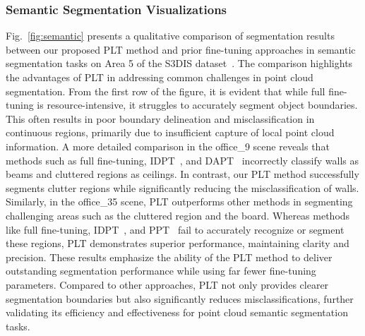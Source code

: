 

\subsubsection{Semantic Segmentation Visualizations}  
Fig.~\ref{fig:semantic} presents a qualitative comparison of segmentation results between our proposed PLT method and prior fine-tuning approaches in semantic segmentation tasks on Area 5 of the S3DIS dataset~\cite{armeni20163d}. The comparison highlights the advantages of PLT in addressing common challenges in point cloud segmentation. From the first row of the figure, it is evident that while full fine-tuning is resource-intensive, it struggles to accurately segment object boundaries. This often results in poor boundary delineation and misclassification in continuous regions, primarily due to insufficient capture of local point cloud information. A more detailed comparison in the office\_9 scene reveals that methods such as full fine-tuning, IDPT~\cite{zha2023instance}, and DAPT~\cite{zhou2024dynamic} incorrectly classify walls as beams and cluttered regions as ceilings. In contrast, our PLT method successfully segments clutter regions while significantly reducing the misclassification of walls. Similarly, in the office\_35 scene, PLT outperforms other methods in segmenting challenging areas such as the cluttered region and the board. Whereas methods like full fine-tuning, IDPT~\cite{zha2023instance}, and PPT~\cite{zhang2024positional} fail to accurately recognize or segment these regions, PLT demonstrates superior performance, maintaining clarity and precision. These results emphasize the ability of the PLT method to deliver outstanding segmentation performance while using far fewer fine-tuning parameters. Compared to other approaches, PLT not only provides clearer segmentation boundaries but also significantly reduces misclassifications, further validating its efficiency and effectiveness for point cloud semantic segmentation tasks.












